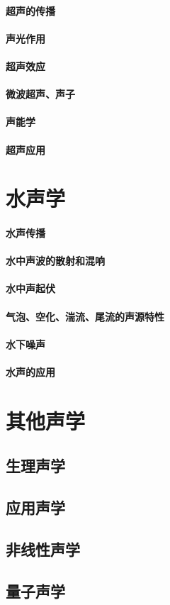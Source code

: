 \documentclass[UTF8]{../06-Physics}
\begin{document}
    \subsubsection{超声的传播}
    \subsubsection{声光作用}
    \subsubsection{超声效应}
    \subsubsection{微波超声、声子}
    \subsubsection{声能学}
    \subsubsection{超声应用}



\chapter{水声学}
    \subsubsection{水声传播}
    \subsubsection{水中声波的散射和混响}
    \subsubsection{水中声起伏}
    \subsubsection{气泡、空化、湍流、尾流的声源特性}
    \subsubsection{水下噪声}
    \subsubsection{水声的应用}



\chapter{其他声学}
    
\section{生理声学}
\section{应用声学}

\section{非线性声学}
\section{量子声学}
\end{document}
